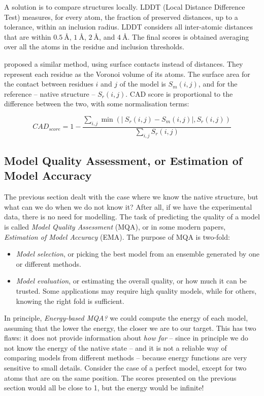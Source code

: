 A solution is to compare structures locally. 
LDDT (Local Distance Difference Test) \citep{lddt} 
measures, for every atom, the fraction of preserved  distances, up to a tolerance, within an inclusion radius.
LDDT considers all inter-atomic distances that are within $\SI{0.5}{\angstrom}$, $\SI{1}{\angstrom}$, $\SI{2}{\angstrom}$, and $\SI{4}{\angstrom}$.
The final scores is obtained averaging over all the atoms in the residue and inclusion thresholds.

\citet{cad} proposed a similar method, using surface contacts instead of distances. 
They represent each residue as the Voronoi volume of its atoms.
The surface area for the contact between residues $i$ and $j$ of the model is $S_m(i,j)$, and for the reference -- native structure -- $S_r(i,j)$.
CAD score is proportional to the difference between the two, with some normalisation terms:

\begin{equation*}
CAD_{score} = 1 - \frac{\sum_{i,j} \min\left( \left| \: S_{r}(i, j) - S_{m}(i, j)\right|, S_{r}(i, j)\right)}{\sum_{i,j} S_{r}(i, j)}
\end{equation*}

\subsection{Model Quality Assessment, or Estimation of Model Accuracy}
The previous section dealt with the case where we know the native structure, but what can we do when we do not know it?
After all, if we have the experimental data, there is no need for modelling.
The task of predicting the quality of a model is called \emph{Model Quality Assessment} (MQA), or in some modern papers, \emph{Estimation of Model Accuracy} (EMA).
The purpose of MQA is two-fold:

\begin{itemize}
\item \emph{Model selection}, or picking the best model from an ensemble generated by one or different methods.
\item \emph{Model evaluation}, or estimating the overall quality, or how much it can be trusted.
Some applications may require high quality models, while for others, knowing the right fold is sufficient.
\end{itemize}

In principle, \emph{Energy-based MQA?} we could compute the energy of each model, assuming that the lower the energy, the closer we are to our target.
This has two flaws: it does not provide information about \emph{how far} -- since in principle we do not know the energy of the native state -- and it is not a reliable way of comparing models from different methods -- because energy functions are very sensitive to small details.
Consider the case of a perfect model, except for two atoms that are on the same position.
The scores presented on the previous section would all be close to 1, but the energy would be infinite!

